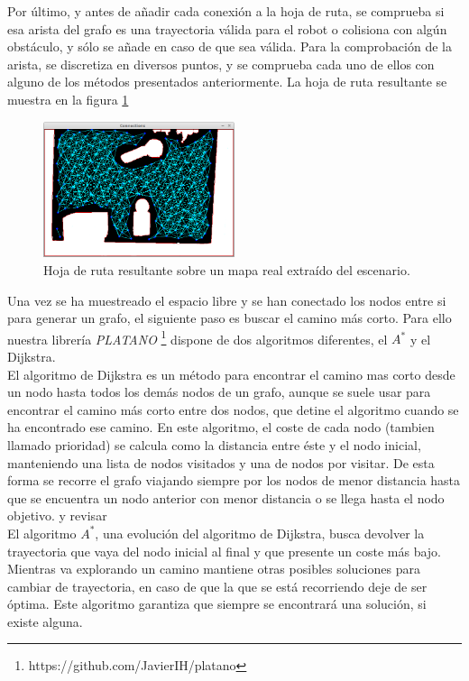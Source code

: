 Por último, y antes de añadir cada conexión a la hoja de ruta, se comprueba si esa arista del grafo es una trayectoria válida para el robot o colisiona con algún obstáculo, y sólo se añade en caso de que sea válida. Para la comprobación de la arista, se discretiza en diversos puntos, y se comprueba cada uno de ellos con alguno de los métodos presentados anteriormente. La hoja de ruta resultante se muestra en la figura \ref{fig:hoja_ruta}\\

\begin{figure}[H]
        \centering
        \includegraphics[width=0.5\textwidth]{images/roadmap.png}
        \caption{Hoja de ruta resultante sobre un mapa real extraído del escenario.}
        \label{fig:hoja_ruta}
\end{figure} 

Una vez se ha muestreado el espacio libre y se han conectado los nodos entre si para generar un grafo, el siguiente paso es buscar el camino más corto. Para ello nuestra librería \textit{PLATANO} \footnote{https://github.com/JavierIH/platano} dispone de dos algoritmos diferentes, el $A^*$ y el Dijkstra.\\

El algoritmo de Dijkstra es un método para encontrar el camino mas corto desde un nodo hasta todos los demás nodos de un grafo, aunque se suele usar para encontrar el camino más corto entre dos nodos, que detine el algoritmo cuando se ha encontrado ese camino. En este algoritmo, el coste de cada nodo (tambien llamado prioridad) se calcula como la distancia entre éste y el nodo inicial, manteniendo una lista de nodos visitados y una de nodos por visitar. De esta forma se recorre el grafo viajando siempre por los nodos de menor distancia hasta que se encuentra un nodo anterior con menor distancia o se llega hasta el nodo objetivo. y revisar \\

El algoritmo $A^*$, una evolución del algoritmo de Dijkstra, busca devolver la trayectoria que vaya del nodo inicial al final y que presente un coste más bajo. Mientras va explorando un camino mantiene otras posibles soluciones para cambiar de trayectoria, en caso de que la que se está recorriendo deje de ser óptima. Este algoritmo garantiza que siempre se encontrará una solución, si existe alguna.\\


